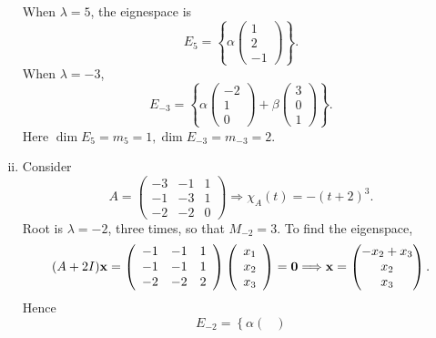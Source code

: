 \documentclass[10pt]{article}
\begin{document}
\begin{example}
\begin{enumerate}[(i)]
            When $ \lambda=5 $, the eignespace is
            \[
                E_5=\left\{ \alpha\begin{pmatrix}
                    1\\2\\-1
                \end{pmatrix} \right\}
            .\]
            When $ \lambda=-3 $,
            \[
                E_{-3}=\left\{ \alpha\begin{pmatrix}
                    -2\\1\\0
                \end{pmatrix}+\beta\begin{pmatrix}
                    3\\0\\1
                \end{pmatrix} \right\}
            .\]
            Here $ \dim E_5 = m_5=1, \dim E_{-3}=m_{-3}=2 $.
            \item Consider 
            \[
                A=\begin{pmatrix}
                    -3&-1&1\\
                    -1&-3&1\\
                    -2&-2&0
                \end{pmatrix}
                \Longrightarrow 
                \chi_A(t)=-(t+2)^3
            .\]
            Root is $ \lambda=-2 $, three times, so that $ M_{-2}=3 $. To find the eigenspace,
            \[
                (A+2 I) {\bf x}=\left(\begin{array}{rrr}
                    -1 & -1 & 1 \\
                    -1 & -1 & 1 \\
                    -2 & -2 & 2
                    \end{array}\right)\left(\begin{array}{l}
                    x_{1} \\
                    x_{2} \\
                    x_{3}
                    \end{array}\right)=\mathbf{0} \Longrightarrow {\bf x}=\begin{pmatrix}
                        -x_2+x_3\\x_2\\x_3
                    \end{pmatrix}
            .\]
            Hence 
            \[
                E_{-2}=\left\{ \alpha\begin{pmatrix}

\end{pmatrix}\]
\end{enumerate}
\end{example}
\end{document}
